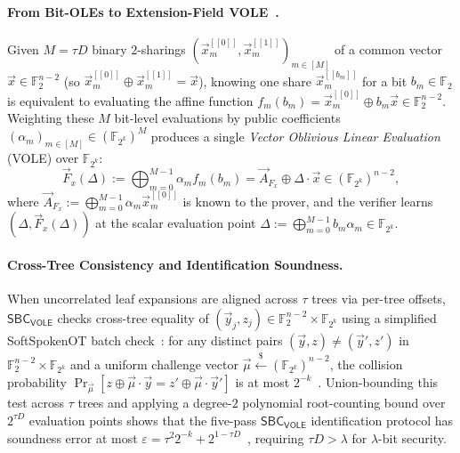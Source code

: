 \documentclass[11pt,a4paper]{article}
\theoremstyle{definition}
\theoremstyle{remark}
\newcommand{\Ftwo}{\mathbb{F}_2}
\newcommand{\Ftwok}{\mathbb{F}_{2^k}}
\newcommand{\SBCVOLE}{\mathsf{SBC}_{\mathsf{VOLE}}}
\newcommand{\share}[1]{[\![#1]\!]}
\begin{document}
\paragraph{From Bit-OLEs to Extension-Field VOLE~\cite{YSWW21,Roy22,BBDKORS23}.}
Given $M = \tau D$ binary $2$-sharings $(\vec{x}_m^{\share{0}}, \vec{x}_m^{\share{1}})_{m \in [M]}$ of a common vector $\vec{x} \in \Ftwo^{n-2}$ (so $\vec{x}_m^{\share{0}} \oplus \vec{x}_m^{\share{1}} = \vec{x}$), knowing one share $\vec{x}_m^{\share{b_m}}$ for a bit $b_m \in \Ftwo$ is equivalent to evaluating the affine function $f_m(b_m) = \vec{x}_m^{\share{0}} \oplus b_m \vec{x} \in \Ftwo^{n-2}$. Weighting these $M$ bit-level evaluations by public coefficients $(\alpha_m)_{m \in [M]} \in (\Ftwok)^M$ produces a single \emph{Vector Oblivious Linear Evaluation} (VOLE) over $\Ftwok$:
\[
\vec{F}_x(\Delta) := \bigoplus_{m=0}^{M-1} \alpha_m f_m(b_m) = \vec{A}_{F_x} \oplus \Delta \cdot \vec{x} \in (\Ftwok)^{n-2},
\]
where $\vec{A}_{F_x} := \bigoplus_{m=0}^{M-1} \alpha_m \vec{x}_m^{\share{0}}$ is known to the prover, and the verifier learns $(\Delta, \vec{F}_x(\Delta))$ at the scalar evaluation point $\Delta := \bigoplus_{m=0}^{M-1} b_m \alpha_m \in \Ftwok$.

\paragraph{Cross-Tree Consistency and Identification Soundness.}
When uncorrelated leaf expansions are aligned across $\tau$ trees via per-tree offsets, $\SBCVOLE$ checks cross-tree equality of $(\vec{y}_j, z_j) \in \Ftwo^{n-2} \times \Ftwok$ using a simplified SoftSpokenOT batch check~\cite{Roy22,HJ25}: for any distinct pairs $(\vec{y}, z) \neq (\vec{y}', z')$ in $\Ftwo^{n-2} \times \Ftwok$ and a uniform challenge vector $\vec{\mu} \xleftarrow{\$} (\Ftwok)^{n-2}$, the collision probability $\Pr_{\vec{\mu}}[z \oplus \vec{\mu} \cdot \vec{y} = z' \oplus \vec{\mu} \cdot \vec{y}']$ is at most $2^{-k}$~\cite[Lemma~1]{HJ25}. Union-bounding this test across $\tau$ trees and applying a degree-$2$ polynomial root-counting bound over $2^{\tau D}$ evaluation points shows that the five-pass $\SBCVOLE$ identification protocol has soundness error at most $\varepsilon = \tau^2 2^{-k} + 2^{1 - \tau D}$~\cite[Theorem~1]{HJ25}, requiring $\tau D > \lambda$ for $\lambda$-bit security.
\end{document}
